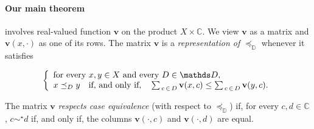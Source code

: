 \documentclass[12pt,a4paper,twoside]{article}
\newcommand{\mbbd}{{\mathds D}}
\newcommand{\mbbc}{{\mathds C}}
\begin{document}
\paragraph{Our main theorem\hskip-5pt} involves real-valued
function $\mathbf{v}$ on the product $X \times \mbbc$. We view $\mathbf{v}$ as
a matrix and $\mathbf{v}(x, \cdot)$ as one of its rows.  The matrix
$\mathbf{v}$ is a \emph{representation of $\preceq_{\mbbd}$} whenever it
satisfies \label{sec-main}
 \begin{linenomath*} 
\begin{equation}\notag\label{eq-rep-main}
  \left\{
  \begin{array}{l}
    \text{for every $x , y \in X$ and every $D \in \mbbd$,}\\
    x \preceq_{D} y \quad \text{if, and only if,} \quad \sum _ {\, c \,\in\, D}
    \mathbf{v}(x, c) \leq \sum_{\, c \,\in\, D} \mathbf{v}(y, c) .
  \end{array}\right.
\end{equation}
\end{linenomath*}
The matrix $\mathbf{v}$ \emph{respects case equivalence} (with respect to
$\preceq_{\mbbd}$) if, for every $c,d\in \mbbc$, $c \sim^{\star} d$ if, and
only if, the columns $\mathbf{v}(\cdot, c)$ and $\mathbf{v}(\cdot, d)$ are equal.
\end{document}
